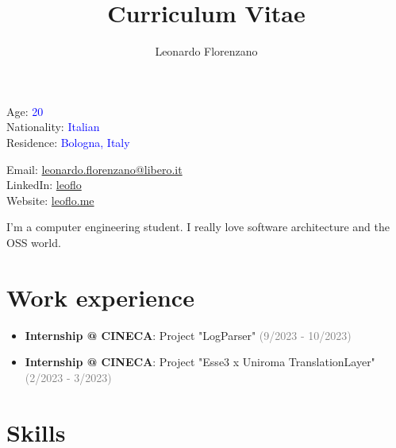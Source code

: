 \documentclass{paper}
\title{Curriculum Vitae}
\author{Leonardo Florenzano}
\begin{document}
\maketitle

\begin{multicols}{2}

\noindent
Age: \textcolor{blue}{20}\\
Nationality: \textcolor{blue}{Italian}\\
Residence: \textcolor{blue}{Bologna, Italy}

\columnbreak

\noindent
Email: \href{mailto:leonardo.florenzano@libero.it}{leonardo.florenzano@libero.it}\\
LinkedIn: \href{https://www.linkedin.com/in/leoflo}{leoflo}\\
Website: \href{https://leoflo.me}{leoflo.me}

\end{multicols}

\noindent
I'm a computer engineering student.
I really love software architecture and the OSS world.

\section{Work experience}

\begin{itemize}
    \item \textbf{Internship @ CINECA}: Project "LogParser" \textcolor{gray}{(9/2023 - 10/2023)}
    \item \textbf{Internship @ CINECA}: Project "Esse3 x Uniroma TranslationLayer" \textcolor{gray}{(2/2023 - 3/2023)}
\end{itemize}

\section{Skills}
\end{document}

